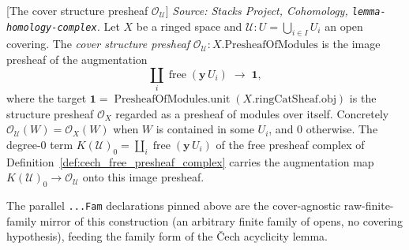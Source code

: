 \begin{definition}

[The cover structure presheaf \(\mathcal{O}_\mathcal{U}\)]
  \label{def:cover_structure_presheaf}
  \textit{Source: Stacks Project, Cohomology, \texttt{lemma-homology-complex}.}
  Let \(X\) be a ringed space and \(\mathcal{U} : U = \bigcup_{i \in I} U_i\) an open
  covering. The \emph{cover structure presheaf} \(\mathcal{O}_{\mathcal{U}} :
  X.\mathrm{PresheafOfModules}\) is the image presheaf of the augmentation
  \[
    \coprod_i \operatorname{free}(\mathbf{y}\,U_i) \;\longrightarrow\; \mathbf{1},
  \]
  where the target \(\mathbf{1} = \operatorname{PresheafOfModules.unit}(
  X.\mathrm{ringCatSheaf}.\mathrm{obj})\) is the structure presheaf \(\mathcal{O}_X\)
  regarded as a presheaf of modules over itself. Concretely
  \(\mathcal{O}_{\mathcal{U}}(W) = \mathcal{O}_X(W)\) when \(W\) is contained in some
  \(U_i\), and \(0\) otherwise. The degree-\(0\) term
  \(K(\mathcal{U})_0 = \coprod_i \operatorname{free}(\mathbf{y}\,U_i)\) of the free
  presheaf complex of Definition~\ref{def:cech_free_presheaf_complex} carries the
  augmentation map \(K(\mathcal{U})_0 \to \mathcal{O}_{\mathcal{U}}\) onto this image
  presheaf.

  The parallel \texttt{...Fam} declarations pinned above are the cover-agnostic
  raw-finite-family mirror of this construction (an arbitrary finite family of opens,
  no covering hypothesis), feeding the family form of the {\v C}ech acyclicity lemma.
\end{definition}

